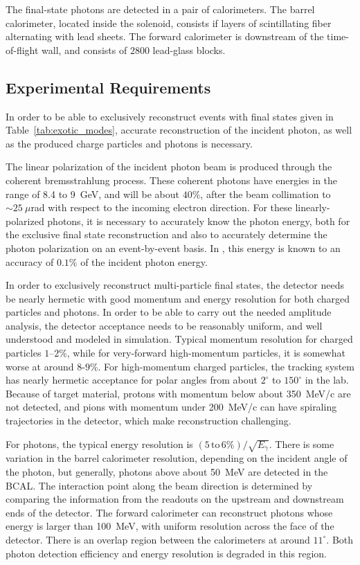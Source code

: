 The final-state photons are detected in a pair of calorimeters. The barrel calorimeter, located inside the 
solenoid, consists if layers of scintillating fiber alternating with lead sheets. The forward calorimeter
is downstream of the time-of-flight wall, and consists of $2800$ lead-glass blocks. 

\subsection[Experimental Requirements]{Experimental Requirements \label{sec:intro:requirements}}
In order to be able to exclusively reconstruct events with final states given in Table~\ref{tab:exotic_modes},
accurate reconstruction of the incident photon, as well as the produced charge particles and photons
is necessary. 

The linear polarization of the incident photon beam is produced through the coherent 
bremsstrahlung process. These coherent photons have energies in the range of 8.4 to 9~GeV,
and will be about $40\%$, after the beam collimation to $\sim{}25~\mu$rad with respect to the incoming 
electron direction. For these linearly-polarized photons, it is necessary to accurately know the photon 
energy, both for the exclusive final state reconstruction and also to accurately determine the photon 
polarization on an event-by-event basis. In \GX{}, this energy is known to an accuracy of $0.1\%$ of the
incident photon energy.

In order to exclusively reconstruct multi-particle final states, the \GX{} detector needs be nearly
hermetic with good momentum and energy resolution for both charged particles and photons.
In order to be able to carry out the needed amplitude analysis, the detector acceptance  needs to 
be reasonably uniform, and well understood and modeled in simulation. Typical momentum resolution
for charged particles $1$--$2\%$, while for very-forward high-momentum particles, it is somewhat
worse at around $8$-$9\%$. For high-momentum charged particles, the tracking system has 
nearly hermetic acceptance for polar angles from about $2^{\circ}$ to $150^{\circ}$ in the lab. 
Because of target material, protons with momentum below about 350~MeV/c are not detected,
and pions with momentum under 200~MeV/c can have spiraling trajectories in the detector,
which make reconstruction challenging.

For photons, the typical energy resolution is $(5\,\mathrm{to}\,6\%)/\sqrt{E_{\gamma}}$. There is some 
variation in the barrel calorimeter resolution, depending on the incident angle of the photon,
but generally, photons above about 50~MeV are detected in the BCAL. The interaction point
along the beam direction is determined by comparing the information from the readouts on the 
upstream and downstream ends of the detector. The forward calorimeter can reconstruct photons
whose energy is larger than 100~MeV, with uniform resolution across the face of the detector.
There is an overlap region between the calorimeters at around $11^{\circ}$. Both photon detection 
efficiency and energy resolution is degraded in this region. 
 
